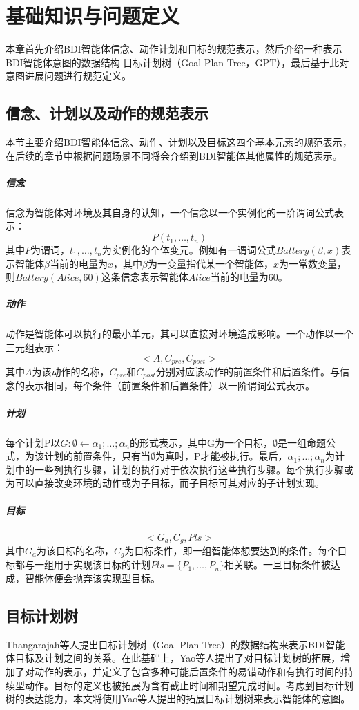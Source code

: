 \chapter{基础知识与问题定义}
本章首先介绍BDI智能体信念、动作计划和目标的规范表示，然后介绍一种表示BDI智能体意图的数据结构-目标计划树（Goal-Plan Tree，GPT），最后基于此对意图进展问题进行规范定义。
\section{信念、计划以及动作的规范表示}
本节主要介绍BDI智能体信念、动作、计划以及目标这四个基本元素的规范表示，在后续的章节中根据问题场景不同将会介绍到BDI智能体其他属性的规范表示。
\paragraph{信念}
信念为智能体对环境及其自身的认知，一个信念以一个实例化的一阶谓词公式表示：
$$P(t_1, \ldots,t_n)$$
其中$P$为谓词，$t_1, \ldots,t_n$为实例化的个体变元。例如有一谓词公式$Battery(\beta, x)$表示智能体$\beta$当前的电量为$x$，其中$\beta$为一变量指代某一个智能体，$x$为一常数变量，则$Battery(Alice, 60)$这条信念表示智能体$Alice$当前的电量为$60$。
\paragraph{动作}
动作是智能体可以执行的最小单元，其可以直接对环境造成影响。一个动作以一个三元组表示：
$$<A,C_{pre},C_{post}>$$
其中$A$为该动作的名称，$C_{pre}$和$C_{post}$分别对应该动作的前置条件和后置条件。与信念的表示相同，每个条件（前置条件和后置条件）以一阶谓词公式表示。
\paragraph{计划}
每个计划P以$G:\emptyset \gets \alpha_1; \dots;\alpha_n$的形式表示，其中G为一个目标，$\emptyset$是一组命题公式，为该计划的前置条件，只有当$\emptyset$为真时，P才能被执行。最后，$\alpha_1; \dots;\alpha_n$为计划中的一些列执行步骤，计划的执行对于依次执行这些执行步骤。每个执行步骤或为可以直接改变环境的动作或为子目标，而子目标可其对应的子计划实现。
\paragraph{目标}
$$<G_a,C_g,Pls>$$
其中$G_a$为该目标的名称，$C_g$为目标条件，即一组智能体想要达到的条件。每个目标都与一组用于实现该目标的计划$Pls=\{P_1,\dots,P_n\}$相关联。一旦目标条件被达成，智能体便会抛弃该实现型目标。

\section{目标计划树}
Thangarajah等人\cite{DBLP:journals/jar/ThangarajahP11,DBLP:conf/ijcai/ThangarajahPW03,DBLP:conf/ijcai/ThangarajahPW03,DBLP:conf/ecai/ThangarajahWPF02}提出目标计划树（Goal-Plan Tree）的数据结构来表示BDI智能体目标及计划之间的关系。在此基础上，Yao等人\cite{DBLP:conf/atal/YaoSL16}提出了对目标计划树的拓展，增加了对动作的表示，并定义了包含多种可能后置条件的易错动作和有执行时间的持续型动作。目标的定义也被拓展为含有截止时间和期望完成时间。考虑到目标计划树的表达能力，本文将使用Yao等人提出的拓展目标计划树来表示智能体的意图。

